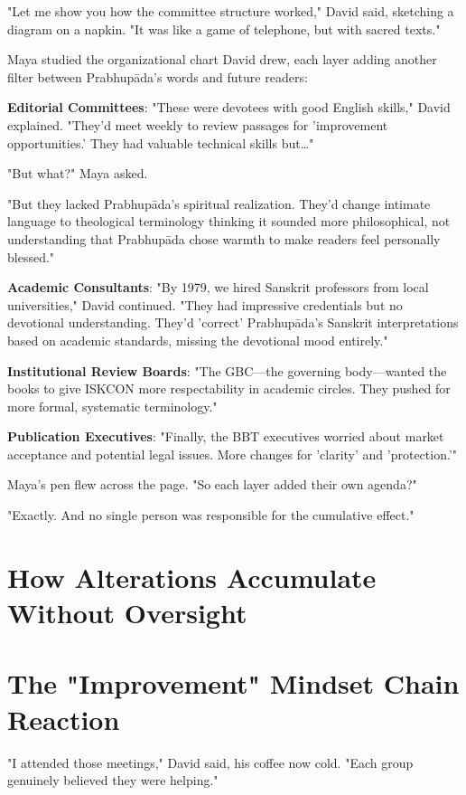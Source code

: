 \documentclass[11pt,twoside]{book}
\begin{document}
"Let me show you how the committee structure worked," David said, sketching a diagram on a napkin. "It was like a game of telephone, but with sacred texts."

Maya studied the organizational chart David drew, each layer adding another filter between Prabhupāda's words and future readers:

\textbf{\textbf{Editorial Committees}}: "These were devotees with good English skills," David explained. "They'd meet weekly to review passages for 'improvement opportunities.' They had valuable technical skills but\ldots{}"

"But what?" Maya asked.

"But they lacked Prabhupāda's spiritual realization. They'd change intimate language to theological terminology thinking it sounded more philosophical, not understanding that Prabhupāda chose warmth to make readers feel personally blessed."

\textbf{\textbf{Academic Consultants}}: "By 1979, we hired Sanskrit professors from local universities," David continued. "They had impressive credentials but no devotional understanding. They'd 'correct' Prabhupāda's Sanskrit interpretations based on academic standards, missing the devotional mood entirely."

\textbf{\textbf{Institutional Review Boards}}: "The GBC—the governing body—wanted the books to give ISKCON more respectability in academic circles. They pushed for more formal, systematic terminology."

\textbf{\textbf{Publication Executives}}: "Finally, the BBT executives worried about market acceptance and potential legal issues. More changes for 'clarity' and 'protection.'"

Maya's pen flew across the page. "So each layer added their own agenda?"

"Exactly. And no single person was responsible for the cumulative effect."
\section*{How Alterations Accumulate Without Oversight}
\label{sec:orge0f3ef4}

\section*{The "Improvement" Mindset Chain Reaction}
\label{sec:org335cc77}

"I attended those meetings," David said, his coffee now cold. "Each group genuinely believed they were helping."
\end{document}
